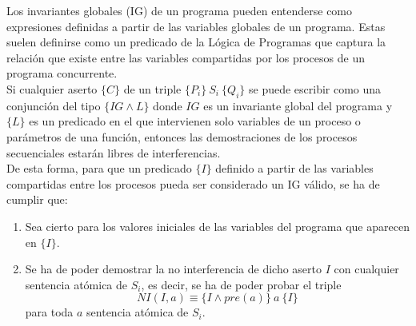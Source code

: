Los invariantes globales (IG) de un programa pueden entenderse como expresiones definidas a partir de las variables globales de un programa. Estas suelen definirse como un predicado de la Lógica de Programas que captura la relación que existe entre las variables compartidas por los procesos de un programa concurrente.\\

Si cualquier aserto $\{C\}$ de un triple $\{P_i\}\ S_i\ \{Q_i\}$ se puede escribir como una conjunción del tipo $\{IG \land L\}$ donde $IG$ es un invariante global del programa y $\{L\}$ es un predicado en el que intervienen solo variables de un proceso o parámetros de una función, entonces las demostraciones de los procesos secuenciales estarán libres de interferencias.\\

De esta forma, para que un predicado $\{I\}$ definido a partir de las variables compartidas entre los procesos pueda ser considerado un IG válido, se ha de cumplir que:
\begin{enumerate}
    \item Sea cierto para los valores iniciales de las variables del programa que aparecen en $\{I\}$.
    \item Se ha de poder demostrar la no interferencia de dicho aserto $I$ con cualquier sentencia atómica de $S_i$, es decir, se ha de poder probar el triple
        \begin{equation*}
            NI(I, a) \equiv \{I \land pre(a)\}\ a\ \{I\}
        \end{equation*}
        para toda $a$ sentencia atómica de $S_i$.
\end{enumerate}


